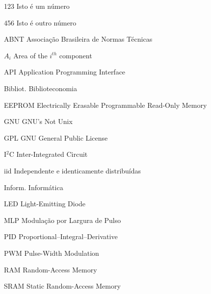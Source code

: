 
\begin{siglas}
  \item [123] Isto é um número
  \item [456] Isto é outro número
  \item [ABNT] Associação Brasileira de Normas Técnicas
  \item [$A_i$] Area of the $i^{th}$ component
  \item [API] Application Programming Interface
  \item [Bibliot.] Biblioteconomia
  \item [EEPROM] Electrically Erasable Programmable Read-Only Memory
  \item [GNU] GNU's Not Unix
  \item [GPL] GNU General Public License
  \item [I$^2$C] Inter-Integrated Circuit
  \item [iid] Independente e identicamente distribuídas
  \item [Inform.] Informática
  \item [LED] Light-Emitting Diode
  \item [MLP] Modulação por Largura de Pulso
  \item [PID] Proportional--Integral--Derivative
  \item [PWM] Pulse-Width Modulation
  \item [RAM] Random-Access Memory
  \item [SRAM] Static Random-Access Memory
\end{siglas}
